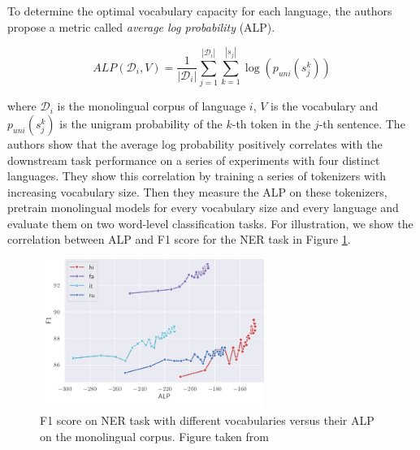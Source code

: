 To determine the optimal vocabulary capacity for each language, the authors propose a metric called \textit{average log probability} (ALP). 

$$
ALP(\mathcal{D}_i, V) = \frac{1}{|\mathcal{D}_i|} \sum_{j=1}^{|\mathcal{D}_i|} \sum_{k=1}^{|s_j|} \log(p_{uni}(s^k_{j}))
$$

where $\mathcal{D}_i$ is the monolingual corpus of language $i$, $V$ is the vocabulary and $p_{uni}(s^k_{j})$ is the unigram probability of the $k$-th token in the $j$-th sentence. The authors show that the average log probability positively correlates with the downstream task performance on a series of experiments with four distinct languages. They show this correlation by training a series of tokenizers with increasing vocabulary size. Then they measure the ALP on these tokenizers, pretrain monolingual models for every vocabulary size and every language and evaluate them on two word-level classification tasks. For illustration, we show the correlation between ALP and F1 score for the NER task in Figure \ref{fig:alp_vs_NER}. 


\begin{figure}[h]
    \centering
    \includegraphics[width=0.65\textwidth]{img/temp/alp_vs_NER.png}
    \caption{F1 score on NER task with different vocabularies versus their ALP on the monolingual corpus. Figure taken from \cite{zheng_allocating_2021}}
    \label{fig:alp_vs_NER}
\end{figure}


